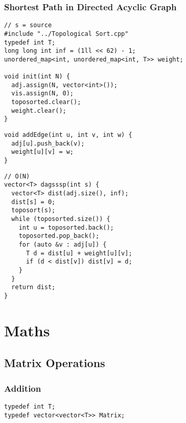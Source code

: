 \documentclass[twoside]{article}
\begin{document}
\begin{multicols*}{2}
\subsubsectionfont{\large\bfseries\sffamily\underline}
\subsubsection*{Shortest Path in Directed Acyclic Graph}
\begin{verbatim}
// s = source
#include "../Topological Sort.cpp"
typedef int T;
long long int inf = (1ll << 62) - 1;
unordered_map<int, unordered_map<int, T>> weight;

void init(int N) {
  adj.assign(N, vector<int>());
  vis.assign(N, 0);
  toposorted.clear();
  weight.clear();
}
\end{verbatim}
\vspace{-12pt}
\begin{verbatim}
void addEdge(int u, int v, int w) {
  adj[u].push_back(v);
  weight[u][v] = w;
}
\end{verbatim}
\vspace{-12pt}
\begin{verbatim}
// O(N)
vector<T> dagsssp(int s) {
  vector<T> dist(adj.size(), inf);
  dist[s] = 0;
  toposort(s);
  while (toposorted.size()) {
    int u = toposorted.back();
    toposorted.pop_back();
    for (auto &v : adj[u]) {
      T d = dist[u] + weight[u][v];
      if (d < dist[v]) dist[v] = d;
    }
  }
  return dist;
}
\end{verbatim}

\sectionfont{\bfseries\sffamily\centering\Huge}
\vspace{1em}
\section*{Maths}
\vspace{3em}
\subsectionfont{\bfseries\sffamily\centering\LARGE}
\vspace{0em}
\subsection*{Matrix Operations}
\vspace{2em}
\subsubsectionfont{\large\bfseries\sffamily\underline}
\subsubsection*{Addition}
\begin{verbatim}
typedef int T;
typedef vector<vector<T>> Matrix;


\end{verbatim}
\end{multicols*}
\end{document}
